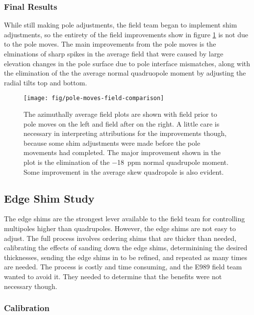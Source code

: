 \subsubsection{Final Results}

While still making pole adjustments, the field team began to implement shim adjustments, so the entirety of the field improvements show in figure \ref{fig:pole-moves-field-comparison} is not due to the pole moves.  The main improvements from the pole moves is the elminations of sharp spikes in the average field that were caused by large elevation changes in the pole surface due to pole interface mismatches, along with the elimination of the the average normal quadruopole moment by adjusting the radial tilts top and bottom.

\begin{figure}
\texttt{[image: fig/pole-moves-field-comparison]}
\caption{The azimuthally average field plots are shown with field prior to pole moves on the left and field after on the right.  A little care is necessary in interpreting attributions for the improvements though, because some shim adjustments were made before the pole movements had completed.  The major improvement shown in the plot is the elimination of the \SI{-18}{ppm} normal quadrupole moment.  Some improvement in the average skew quadropole is also evident.}
\label{fig:pole-moves-field-comparison}
\end{figure}

\subsection{Edge Shim Study}

The edge shims are the strongest lever available to the field team for controlling multipoles higher than quadrupoles.  However, the edge shims are not easy to adjust.  The full process involves ordering shims that are thicker than needed, calibrating the effects of sanding down the edge shims, determinining the desired thicknesses, sending the edge shims in to be refined, and repeated as many times are needed.  The process is costly and time consuming, and the E989 field team wanted to avoid it.  They needed to determine that the benefits were not necessary though.

\subsubsection{Calibration}

